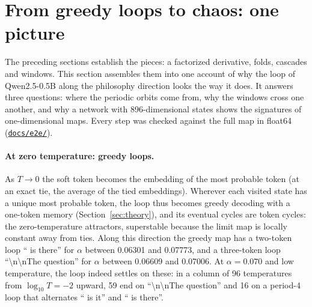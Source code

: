 \documentclass[11pt,letterpaper]{article}
\newcommand{\repourl}{https://github.com/tdj28/neural-shrimp}
\newcommand{\reporef}{arxiv-v1}
\newcommand{\repo}[1]{\href{\repourl/blob/\reporef/#1}{\nolinkurl{#1}}}
\begin{document}
\section{From greedy loops to chaos: one picture}
\label{sec:picture}
The preceding sections establish the pieces: a factorized derivative, folds, cascades and windows. This section
assembles them into one account of why the loop of Qwen2.5-0.5B along the philosophy direction looks the way it does.
It answers three questions: where the periodic orbits come from, why the windows cross one another, and why a network
with 896-dimensional states shows the signatures of one-dimensional maps. Every step was checked against the full map in
float64 (\repo{docs/e2e/}).

\paragraph{At zero temperature: greedy loops.} As $T\to0$ the soft token becomes the embedding of the most probable
token (at an exact tie, the average of the tied embeddings). Wherever each visited state has a unique most probable
token, the loop thus becomes greedy decoding with a one-token memory (Section~\ref{sec:theory}), and its eventual
cycles are token cycles: the zero-temperature attractors, superstable because the limit map is locally constant away
from ties. Along this direction the greedy map has a two-token loop
`` is there'' for $\alpha$ between 0.06301 and 0.07773, and a three-token loop
``\textbackslash n\textbackslash nThe question'' for $\alpha$ between 0.06609 and 0.07006. At $\alpha=0.070$ and low temperature, the loop indeed settles on these: in a column of
96 temperatures from $\log_{10}T=-2$ upward, 59 end on ``\textbackslash n\textbackslash nThe question'' and 16 on
a period-4 loop that alternates `` is it'' and `` is there''.
\end{document}
